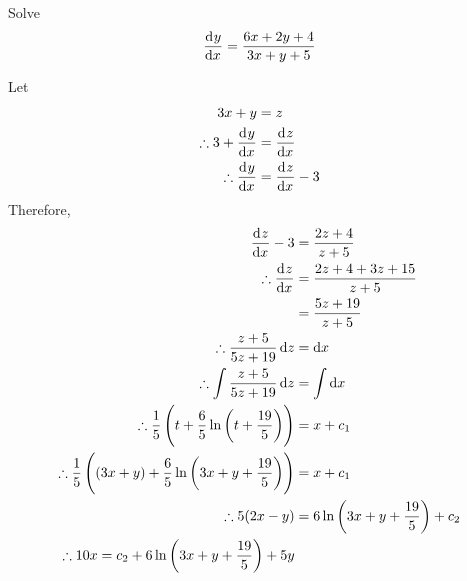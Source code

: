 \documentclass[fleqn, a4paper, 12pt, oneside]{amsart}
\theoremstyle{definition}
\theoremstyle{theorem}
\begin{document}
\begin{question}
	Solve
	\begin{equation*}
		\dod{y}{x} = \dfrac{6x + 2y + 4}{3x + y + 5}
	\end{equation*}
\end{question}

\begin{solution}
	Let
	\begin{align*}
		3x + y &= z\\
		\therefore 3 + \dod{y}{x} &= \dod{z}{x}\\
		\therefore \dod{y}{x} &= \dod{z}{x} - 3
	\end{align*}
	Therefore,
	\begin{align*}
		\dod{z}{x} - 3 &= \dfrac{2z + 4}{z + 5}\\
		\therefore \dod{z}{x} &= \dfrac{2z + 4 + 3z + 15}{z + 5}\\
		&= \dfrac{5z + 19}{z + 5}\\
		\therefore \dfrac{z + 5}{5z + 19} \dif z &= \dif x\\
		\therefore \int \dfrac{z + 5}{5z + 19} \dif z &= \int \dif x\\
		\therefore \dfrac{1}{5} \left( t + \dfrac{6}{5} \ln \left( t + \dfrac{19}{5} \right) \right) &= x + c_1\\
		\therefore \dfrac{1}{5} \left( (3x + y) + \dfrac{6}{5} \ln \left( 3x + y + \dfrac{19}{5} \right) \right) &= x + c_1\\
		\therefore 5(2x - y) &= 6 \ln \left( 3x + y + \dfrac{19}{5} \right) + c_2\\
		\therefore 10 x = c_2 + 6 \ln \left( 3x + y + \dfrac{19}{5} \right) + 5y
	\end{align*}
\end{solution}

\end{document}
